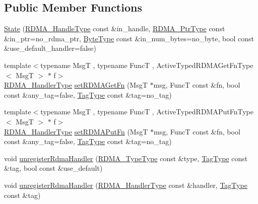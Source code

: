 \subsection*{Public Member Functions}
\begin{DoxyCompactItemize}
\item 
\hyperlink{structvt_1_1rdma_1_1_state_a7ab4e08a915e4b8357e8f079844c9378}{State} (\hyperlink{namespacevt_a10442579ec4e7ebef223818e64bcf908}{R\+D\+M\+A\+\_\+\+Handle\+Type} const \&in\+\_\+handle, \hyperlink{namespacevt_aab05b4a584f7ee835a6d0f66915cf59b}{R\+D\+M\+A\+\_\+\+Ptr\+Type} const \&in\+\_\+ptr=no\+\_\+rdma\+\_\+ptr, \hyperlink{namespacevt_aab8d55968084610ce3b17057981e9300}{Byte\+Type} const \&in\+\_\+num\+\_\+bytes=no\+\_\+byte, bool const \&use\+\_\+default\+\_\+handler=false)
\item 
{\footnotesize template$<$typename MsgT , typename FuncT , Active\+Typed\+R\+D\+M\+A\+Get\+Fn\+Type$<$ Msg\+T $>$ $\ast$ f$>$ }\\\hyperlink{namespacevt_a9530efb893c0f3846e8ac5f0507e0f49}{R\+D\+M\+A\+\_\+\+Handler\+Type} \hyperlink{structvt_1_1rdma_1_1_state_ae44026106376eb1542f36c8549f139da}{set\+R\+D\+M\+A\+Get\+Fn} (MsgT $\ast$msg, FuncT const \&fn, bool const \&any\+\_\+tag=false, \hyperlink{namespacevt_a84ab281dae04a52a4b243d6bf62d0e52}{Tag\+Type} const \&tag=no\+\_\+tag)
\item 
{\footnotesize template$<$typename MsgT , typename FuncT , Active\+Typed\+R\+D\+M\+A\+Put\+Fn\+Type$<$ Msg\+T $>$ $\ast$ f$>$ }\\\hyperlink{namespacevt_a9530efb893c0f3846e8ac5f0507e0f49}{R\+D\+M\+A\+\_\+\+Handler\+Type} \hyperlink{structvt_1_1rdma_1_1_state_a08999d62a472684b1f67a4da6d26fcb4}{set\+R\+D\+M\+A\+Put\+Fn} (MsgT $\ast$msg, FuncT const \&fn, bool const \&any\+\_\+tag=false, \hyperlink{namespacevt_a84ab281dae04a52a4b243d6bf62d0e52}{Tag\+Type} const \&tag=no\+\_\+tag)
\item 
void \hyperlink{structvt_1_1rdma_1_1_state_a3c506325f5d0ce4bb46f93f046dd5e3a}{unregister\+Rdma\+Handler} (\hyperlink{namespacevt_1_1rdma_ac848e1d9da43db6294bd06f83e5d3946}{R\+D\+M\+A\+\_\+\+Type\+Type} const \&type, \hyperlink{namespacevt_a84ab281dae04a52a4b243d6bf62d0e52}{Tag\+Type} const \&tag, bool const \&use\+\_\+default)
\item 
void \hyperlink{structvt_1_1rdma_1_1_state_a03702b768cf198e89b9f0323c12d916c}{unregister\+Rdma\+Handler} (\hyperlink{namespacevt_a9530efb893c0f3846e8ac5f0507e0f49}{R\+D\+M\+A\+\_\+\+Handler\+Type} const \&handler, \hyperlink{namespacevt_a84ab281dae04a52a4b243d6bf62d0e52}{Tag\+Type} const \&tag)

\end{DoxyCompactItemize}
